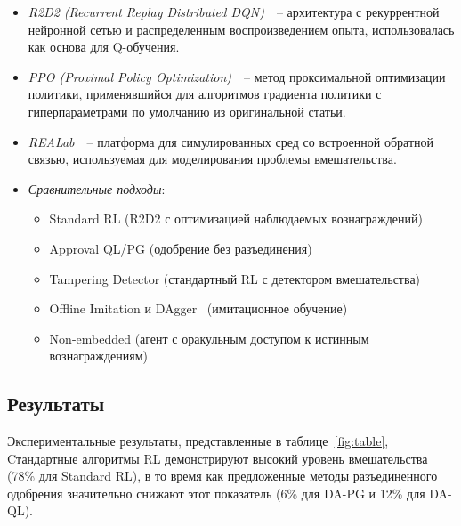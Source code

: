 \begin{itemize}
  \item \emph{R2D2 (Recurrent Replay Distributed DQN)}~\cite{kapturowski2019recurrent}~-- архитектура с рекуррентной нейронной сетью и распределенным воспроизведением опыта, использовалась как основа для Q-обучения.
  
  \item \emph{PPO (Proximal Policy Optimization)}~\cite{schulman2017proximal}~-- метод проксимальной оптимизации политики, применявшийся для алгоритмов градиента политики с гиперпараметрами по умолчанию из оригинальной статьи.
  
  \item \emph{REALab}~\cite{kumar2020realab}~-- платформа для симулированных сред со встроенной обратной связью, используемая для моделирования проблемы вмешательства.
  
  \item \emph{Сравнительные подходы}:
  \begin{itemize}
    \item Standard RL (R2D2 с оптимизацией наблюдаемых вознаграждений)
    \item Approval QL/PG (одобрение без разъединения)
    \item Tampering Detector (стандартный RL с детектором вмешательства)
    \item Offline Imitation и DAgger~\cite{ross2011reduction} (имитационное обучение)
    \item Non-embedded (агент с оракульным доступом к истинным вознаграждениям)
  \end{itemize}
\end{itemize}

\subsection{Результаты}

Экспериментальные результаты, представленные в таблице~\ref{fig:table},  Cтандартные алгоритмы RL демонстрируют высокий уровень вмешательства (78\% для Standard RL), в то время как предложенные методы разъединенного одобрения значительно снижают этот показатель (6\% для DA-PG и 12\% для DA-QL).

